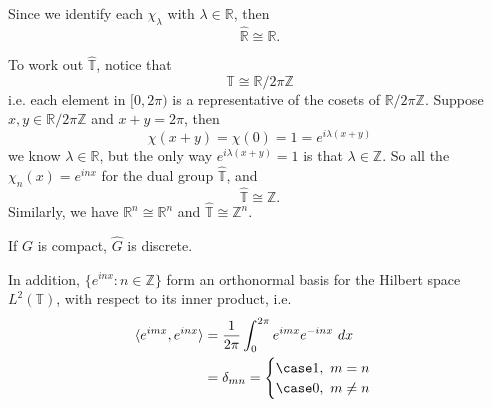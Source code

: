 \documentclass{article}
\begin{document}
Since we identify each $\chi_{\lambda}$ with $\lambda \in \mathbb{R}$, then 
\begin{equation}
    \widehat{\mathbb{R}} \cong \mathbb{R}.
\end{equation}

To work out $\widehat{\mathbb{T}}$, notice that 
\begin{equation}
    \mathbb{T} \cong \mathbb{R} / 2\pi \mathbb{Z}
\end{equation}
i.e. each element in $[0, 2\pi)$ is a representative of the cosets of $\mathbb{R} / 2 \pi \mathbb{Z}$. Suppose $x, y \in \mathbb{R}/2\pi \mathbb{Z}$ and $x+y = 2\pi$, then
\begin{equation}
    \chi(x+y) = \chi(0) = 1 = e^{i\lambda (x+y)}
\end{equation}
we know $\lambda \in \mathbb{R}$, but the only way $e^{i\lambda(x+y)}=1$ is that $\lambda \in \mathbb{Z}$. So all the $\chi_{n}(x) = e^{inx}$ for the dual group $\widehat{\mathbb{T}}$, and 
\begin{equation}
    \widehat{\mathbb{T}} \cong \mathbb{Z}.
\end{equation}
Similarly, we have $\mathbb{R}^{n} \cong \mathbb{R}^{n}$ and $\widehat{\mathbb{T}} \cong \mathbb{Z}^{n}$.

\begin{theorem}
    If $G$ is compact, $\widehat{G}$ is discrete.
\end{theorem} 

In addition, $\{ e^{inx} : n \in \mathbb{Z} \}$ form an orthonormal basis for the Hilbert space $L^{2}(\mathbb{T})$, with respect to its inner product, i.e.
\begin{equation}
    \begin{split}
        \langle e^{imx}, e^{inx} \rangle 
        &= \frac{1}{2\pi} \int^{2\pi}_{0} e^{imx} e^{-inx} \ dx \\
        &= \delta_{mn} = 
        \begin{cases}
            \case 1, \ m=n \\
            \case 0, \ m\neq n \\
        \end{cases}
    \end{split}
\end{equation}
\end{document}
